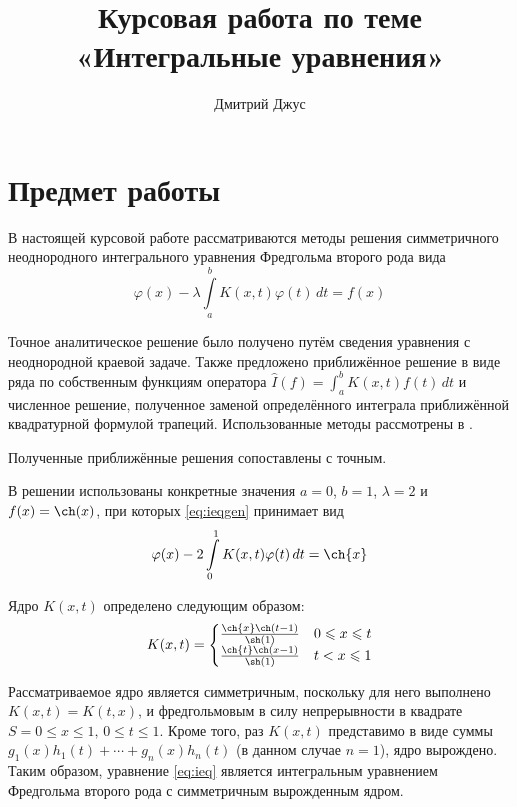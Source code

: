 \documentclass{article}
\numberwithin{equation}{section}
\renewcommand{\phi}{\varphi}
\renewcommand{\leq}{\leqslant}
\newcommand{\intl}{\int\limits}
\begin{document}
\author{Дмитрий Джус}
\title{Курсовая работа по теме \\
  \Huge{«Интегральные уравнения»}}
\pretitle{\begin{center}\LARGE}
  \posttitle{\par\end{center}\vskip 3pc}
\date{}
\maketitle
\thispagestyle{empty}

\clearpage
\tableofcontents

\clearpage
\section{Предмет работы}
\label{sec:problem}
В настоящей курсовой работе рассматриваются методы решения
симметричного неоднородного интегрального уравнения Фредгольма второго
рода вида
\begin{equation}
  \label{eq:ieqgen}
  \phi(x) - \lambda \intl_a^b {K(x, t) \phi(t)\,dt} = f(x)
\end{equation}

Точное аналитическое решение было получено путём сведения уравнения с
неоднородной краевой задаче. Также предложено приближённое решение в
виде ряда по собственным функциям оператора $\hat{I}(f) =
\int_a^b{K(x, t) f(t)\, dt}$ и численное решение, полученное заменой
определённого интеграла приближённой квадратурной формулой трапеций.
Использованные методы рассмотрены в \cite{polyanin03}.

Полученные приближённые решения сопоставлены с точным.

В решении использованы конкретные значения $a=0$, $b=1$, $\lambda = 2$
и $f(x) = \ch(x)$, при которых \eqref{eq:ieqgen} принимает вид
\begin{equation}
  \label{eq:ieq}
  \phi(x) - 2 \intl_0^1 {K(x, t) \phi(t)\,dt} = \ch{x}
\end{equation}

Ядро $K(x,t)$ определено следующим образом:
\begin{equation}
  \label{eq:kernel}
  K(x, t) = 
  \begin{cases}
    \frac{\ch{x} \ch(t-1)}{\sh(1)} & 0 \leq x \leq t\\
    \frac{\ch{t} \ch(x-1)}{\sh(1)} & t < x \leq 1
  \end{cases}
\end{equation}

Рассматриваемое ядро является симметричным, поскольку для него
выполнено $K(x, t) = K(t, x)$, и фредгольмовым в силу непрерывности в
квадрате $S={0\leq x \leq 1,\, 0 \leq t \leq 1}$. Кроме того, раз
$K(x, t)$ представимо в виде суммы $g_1(x)h_1(t) + \dotsb + g_n(x)
h_n(t)$ (в данном случае $n=1$), ядро вырождено. Таким образом,
уравнение \eqref{eq:ieq} является интегральным уравнением Фредгольма
второго рода с симметричным вырожденным ядром.
\end{document}
